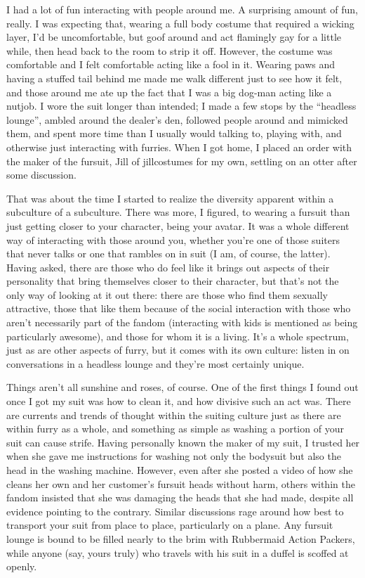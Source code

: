 I had a lot of fun interacting with people around me. A surprising amount of fun, really. I was expecting that, wearing a full body costume that required a wicking layer, I'd be uncomfortable, but goof around and act flamingly gay for a little while, then head back to the room to strip it off. However, the costume was comfortable and I felt comfortable acting like a fool in it. Wearing paws and having a stuffed tail behind me made me walk different just to see how it felt, and those around me ate up the fact that I was a big dog-man acting like a nutjob. I wore the suit longer than intended; I made a few stops by the ``headless lounge'', ambled around the dealer's den, followed people around and mimicked them, and spent more time than I usually would talking to, playing with, and otherwise just interacting with furries. When I got home, I placed an order with the maker of the fursuit, Jill of jillcostumes for my own, settling on an otter after some discussion.

That was about the time I started to realize the diversity apparent within a subculture of a subculture. There was more, I figured, to wearing a fursuit than just getting closer to your character, being your avatar. It was a whole different way of interacting with those around you, whether you're one of those suiters that never talks or one that rambles on in suit (I am, of course, the latter). Having asked, there are those who do feel like it brings out aspects of their personality that bring themselves closer to their character, but that's not the only way of looking at it out there: there are those who find them sexually attractive, those that like them because of the social interaction with those who aren't necessarily part of the fandom (interacting with kids is mentioned as being particularly awesome), and those for whom it is a living. It's a whole spectrum, just as are other aspects of furry, but it comes with its own culture: listen in on conversations in a headless lounge and they're most certainly unique.

Things aren't all sunshine and roses, of course. One of the first things I found out once I got my suit was how to clean it, and how divisive such an act was. There are currents and trends of thought within the suiting culture just as there are within furry as a whole, and something as simple as washing a portion of your suit can cause strife. Having personally known the maker of my suit, I trusted her when she gave me instructions for washing not only the bodysuit but also the head in the washing machine. However, even after she posted a video of how she cleans her own and her customer's fursuit heads without harm, others within the fandom insisted that she was damaging the heads that she had made, despite all evidence pointing to the contrary. Similar discussions rage around how best to transport your suit from place to place, particularly on a plane. Any fursuit lounge is bound to be filled nearly to the brim with Rubbermaid Action Packers, while anyone (say, yours truly) who travels with his suit in a duffel is scoffed at openly.

